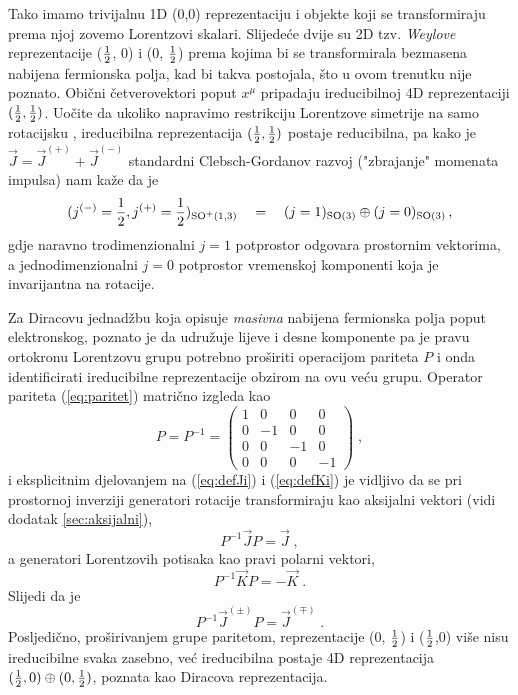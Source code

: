 Tako imamo trivijalnu 1D (0,0) reprezentaciju i objekte koji se
transformiraju prema njoj zovemo Lorentzovi skalari. Slijedeće
dvije su 2D tzv. \emph{Weylove} reprezentacije ($\frac{1}{2}$, 0) i
(0, $\frac{1}{2}$) prema kojima bi se transformirala bezmasena nabijena
fermionska polja, kad bi takva postojala, što u ovom trenutku nije poznato.
 
Obični četverovektori poput $x^\mu$ pripadaju ireducibilnoj
4D reprezentaciji $(\frac{1}{2}, \frac{1}{2})$. Uočite da ukoliko napravimo
restrikciju Lorentzove simetrije  na samo rotacijsku ,
ireducibilna reprezentacija $(\frac{1}{2}, \frac{1}{2})$ postaje reducibilna,
pa kako je $\vec{J}=\vec{J}^{(+)}+\vec{J}^{(-)}$ standardni 
Clebsch-Gordanov razvoj ("zbrajanje" momenata impulsa) nam kaže da
je 
\begin{equation}
(j^{(-)}=\frac{1}{2}, j^{(+)}=\frac{1}{2})_{\mathrm{SO}^{+}(1,3)} \quad = \quad(j=1)_{\mathrm{SO}(3)} \oplus (j=0)_{\mathrm{SO}(3)} \,,
\end{equation} 
gdje naravno trodimenzionalni $j=1$ potprostor odgovara prostornim vektorima,
a jednodimenzionalni $j=0$ potprostor vremenskoj komponenti koja je invarijantna
na rotacije.

Za Diracovu jednadžbu koja opisuje \emph{masivna} nabijena fermionska polja poput elektronskog, 
poznato je da udružuje lijeve
i desne komponente pa je  pravu
ortokronu Lorentzovu grupu potrebno proširiti operacijom pariteta $P$ i onda
identificirati ireducibilne reprezentacije obzirom
na ovu veću grupu. Operator pariteta (\ref{eq:paritet}) 
matrično izgleda kao
\begin{equation}
 P = P^{-1} =
\begin{pmatrix}
1 & 0 & 0 & 0 \\
0 & -1 & 0 & 0 \\
0 & 0 & -1 & 0 \\
0 & 0 & 0 & -1
\end{pmatrix} \;,
\end{equation}
i eksplicitnim djelovanjem na (\ref{eq:defJi}) i (\ref{eq:defKi}) 
je vidljivo da se pri prostornoj inverziji generatori rotacije
transformiraju kao aksijalni vektori (vidi dodatak \ref{sec:aksijalni}),
\begin{equation}
    P^{-1} \vec{J} P = \vec{J} \;,
\end{equation}
a generatori Lorentzovih potisaka kao pravi polarni vektori,
\begin{equation}
    P^{-1} \vec{K} P = - \vec{K} \;.
\end{equation}
Slijedi da je 
\begin{equation}
    P^{-1} \vec{J}^{(\pm)} P = \vec{J}^{(\mp)} \;.
\end{equation}
Posljedično, proširivanjem  grupe paritetom, reprezentacije
(0, $\frac{1}{2}$) i ($\frac{1}{2}$,0) više nisu ireducibilne svaka zasebno,
već ireducibilna postaje 4D reprezentacija $(\frac{1}{2}, 0) \oplus (0, \frac{1}{2})$, poznata
kao Diracova reprezentacija. 


